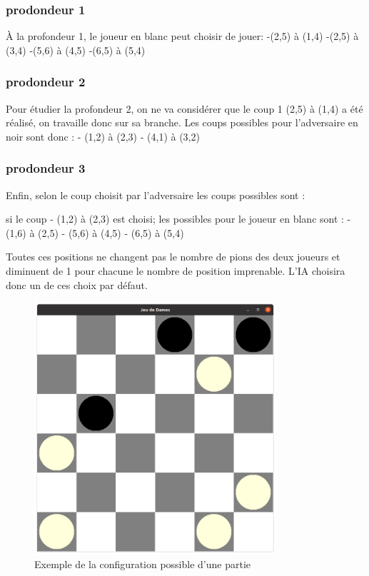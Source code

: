 \documentclass[12,french]{report}
\begin{document}
\subsubsection{prodondeur 1} 
À la profondeur 1, le joueur en blanc peut choisir de jouer:
-(2,5) à (1,4)
-(2,5) à (3,4)
-(5,6) à (4,5)
-(6,5) à (5,4)


\subsubsection{prodondeur 2}
Pour étudier la profondeur 2, on ne va considérer que le coup 1 (2,5) à (1,4) a été réalisé, on travaille donc sur sa branche.
Les coups possibles pour l'adversaire en noir sont donc :
- (1,2) à (2,3)
- (4,1) à (3,2)

\subsubsection{prodondeur 3}
Enfin, selon le coup choisit par l'adversaire les coups possibles sont : 

si le coup - (1,2) à (2,3) est choisi; les possibles pour le joueur en blanc sont :
- (1,6) à (2,5)
- (5,6) à (4,5)
- (6,5) à (5,4)

Toutes ces positions ne changent pas le nombre de pions des deux joueurs et diminuent de 1 pour chacune le nombre de position imprenable. L'IA choisira donc un de ces choix par défaut.

\begin{figure}[H]
	\center
	\includegraphics[width=0.8\textwidth]{./Images/image3heuristique} 
	\caption{Exemple de la configuration possible d'une partie}
\end{figure}\vspace{0.2cm}
\end{document}
